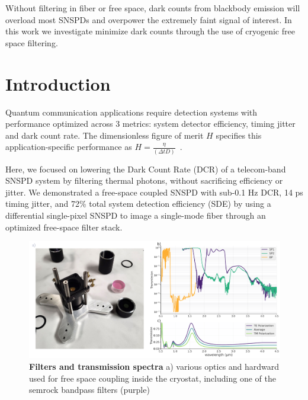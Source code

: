 \documentclass[11pt]{caltech_thesis} %
\begin{document}
Without filtering in fiber or free space, dark counts from blackbody emission will overload most SNSPDs and overpower the extremely faint signal of interest. In this work we investigate minimize dark counts through the use of cryogenic free space filtering.

\hypertarget{introduction-1}{%
\section{Introduction}\label{introduction-1}}

Quantum communication applications require detection systems with performance optimized across 3 metrics: system detector efficiency, timing jitter and dark count rate. The dimensionless figure of merit $H$ specifies this application-specific performance as $H = \frac{\eta}{(\Delta t D)}$~\autocite{Hadfield2009}.

Here, we focused on lowering the Dark Count Rate (DCR) of a telecom-band SNSPD system by filtering thermal photons, without sacrificing efficiency or jitter. We demonstrated a free-space coupled SNSPD with sub-0.1 Hz DCR, 14 ps timing jitter, and 72\% total system detection efficiency (SDE) by using a differential single-pixel SNSPD \autocite{Colangelo2021} to image a single-mode fiber through an optimized free-space filter stack.

\hypertarget{fig:dcrmin_filters}{%
\begin{figure}
\centering
\includegraphics[width=1\textwidth,height=\textheight]{./chapter_02/figs/dcrmin_filters_light.pdf}
\caption[{Filters and transmission spectra}]{\textbf{Filters and transmission spectra} a) various optics and hardward used for free space coupling inside the cryostat, including one of the semrock bandpass filters (purple)}
\label{fig:dcrmin_filters}
\end{figure}
}
\end{document}
